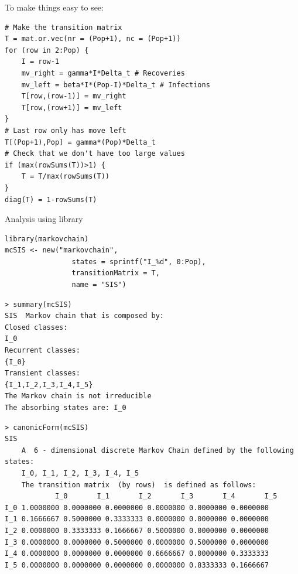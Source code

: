 \documentclass[aspectratio=169]{beamer}
\begin{document}


\begin{frame}[fragile]
    To make things easy to see: 
\begin{lstlisting}
# Make the transition matrix
T = mat.or.vec(nr = (Pop+1), nc = (Pop+1))
for (row in 2:Pop) {
    I = row-1
    mv_right = gamma*I*Delta_t # Recoveries
    mv_left = beta*I*(Pop-I)*Delta_t # Infections
    T[row,(row-1)] = mv_right
    T[row,(row+1)] = mv_left
}
# Last row only has move left
T[(Pop+1),Pop] = gamma*(Pop)*Delta_t
# Check that we don't have too large values
if (max(rowSums(T))>1) {
    T = T/max(rowSums(T))
}
diag(T) = 1-rowSums(T)    
\end{lstlisting}
\end{frame}


\begin{frame}[fragile]{Analysis using  library}
\begin{lstlisting}
library(markovchain)
mcSIS <- new("markovchain", 
                states = sprintf("I_%d", 0:Pop),
                transitionMatrix = T,
                name = "SIS")    
\end{lstlisting}
\vfill
\begin{lstlisting}
> summary(mcSIS)
SIS  Markov chain that is composed by: 
Closed classes: 
I_0 
Recurrent classes: 
{I_0}
Transient classes: 
{I_1,I_2,I_3,I_4,I_5}
The Markov chain is not irreducible 
The absorbing states are: I_0    
\end{lstlisting}
\end{frame}


\begin{frame}[fragile]
\begin{lstlisting}
> canonicForm(mcSIS)
SIS 
    A  6 - dimensional discrete Markov Chain defined by the following states: 
    I_0, I_1, I_2, I_3, I_4, I_5 
    The transition matrix  (by rows)  is defined as follows: 
            I_0       I_1       I_2       I_3       I_4       I_5
I_0 1.0000000 0.0000000 0.0000000 0.0000000 0.0000000 0.0000000
I_1 0.1666667 0.5000000 0.3333333 0.0000000 0.0000000 0.0000000
I_2 0.0000000 0.3333333 0.1666667 0.5000000 0.0000000 0.0000000
I_3 0.0000000 0.0000000 0.5000000 0.0000000 0.5000000 0.0000000
I_4 0.0000000 0.0000000 0.0000000 0.6666667 0.0000000 0.3333333
I_5 0.0000000 0.0000000 0.0000000 0.0000000 0.8333333 0.1666667    
\end{lstlisting}
\end{frame}
\end{document}
